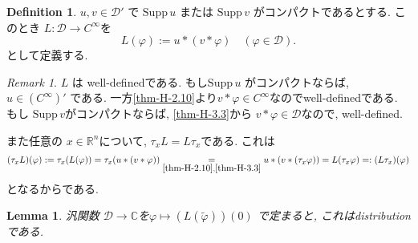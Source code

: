 \documentclass[dvipdfmx,a4paper,11pt]{article} %
\newtheorem{lem}[thm]{Lemma}
\theoremstyle{definition}
\newtheorem{defn}[thm]{Definition}
\theoremstyle{remark}
\newtheorem{rem}[thm]{Remark}
\numberwithin{equation}{section}
\newcommand{\C}{\mathbb{C}}
\begin{document}

\begin{tcolorbox}[mybox]
\begin{defn}\cite[Definition 6.36]{Rud}
\label{defn-H-3.4}
\( u, v \in \mathcal{D}' \) で
\(\mathrm{Supp}\, u\) または \(\mathrm{Supp}\, v\) がコンパクトであるとする. 
このとき
 \( L : \mathcal{D} \to C^\infty \)を
\[
L(\varphi) := u \ast (v \ast \varphi) \quad (\varphi \in \mathcal{D}).
\]
として定義する. 
\end{defn}
\end{tcolorbox}

\begin{rem}
\label{rem-H-3.5}
 \(L\) は well-definedである. 
 もし\(\mathrm{Supp}\, u\) がコンパクトならば, \(u \in (C^\infty)'\) である. 一方\ref{thm-H-2.10}より$v \ast \varphi \in C^{\infty}$なのでwell-definedである. 
もし \(\mathrm{Supp}\, v\)がコンパクトならば, \ref{thm-H-3.3}から \(v \ast \varphi \in \mathcal{D}\)なので, well-defined.

また任意の \(x \in \mathbb{R}^n\)について, \(\tau_x L = L \tau_x\)である.
これは
$$
(\tau_x L )(\varphi) 
:=\tau_x (L (\varphi))
= \tau_x ( u \ast (v \ast \varphi))
\underset{\ref{thm-H-2.10}, \ref{thm-H-3.3}}{=}
u \ast (v \ast (\tau_x \varphi))
=
L(\tau_x \varphi)
=:
(L\tau_x  )(\varphi) 
$$
となるからである. 
\end{rem}

\begin{tcolorbox}[mybox]
\begin{lem}
\label{lem-H-3.6}
汎関数 \( \mathcal{D} \to \C \)を\( \varphi \mapsto (L(\widetilde{\varphi}))(0) \) で定まると, これはdistributionである. 
\end{lem}
\end{tcolorbox}
\end{document}
